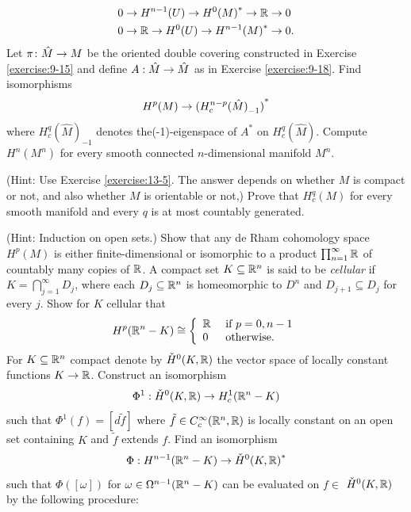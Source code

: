\begin{enumerate}[label=\theexercise.\arabic*.,ref=\theexercise.\arabic*,leftmargin=2.7em]
\[\begin{aligned}
      0 & \rightarrow  {H}^{n- 1}( U)  \rightarrow  {H}^{0}{( M) }^* \rightarrow  \mathbb{R} \rightarrow  0 \\
      0 & \rightarrow  \mathbb{R} \rightarrow  {H}^{0}( U)  \rightarrow  {H}^{n- 1}{( M) }^* \rightarrow  0.
    \end{aligned}
    \]
  \NewItem Let $\pi\colon  \hat{M} \rightarrow  M$ be the oriented double covering constructed in Exercise \ref{exercise:9-15} and define $A : \hat{M} \rightarrow  \hat{M}$ as in Exercise \ref{exercise:9-18}. Find isomorphisms
    \[
      {H}^{p}( M)  \rightarrow  {( {H}_{c}^{n- p}{( \hat{M}) }_{-1}) }^*
    \]
    where ${H}_{c}^{q}{( \hat{M}) }_{-1}$ denotes the(-1)-eigenspace of ${A}^*$ on ${H}_{c}^{q}( \hat{M})$.
  \NewItem Compute ${H}^{n}( {M}^{n})$ for every smooth connected $n$-dimensional manifold ${M}^{n}$.
    \par(Hint: Use Exercise \ref{exercise:13-5}. The answer depends on whether $M$ is compact or not, and also whether $M$ is orientable or not,)
  \NewItem Prove that ${H}_{c}^{q}( M)$ for every smooth manifold and every $q$ is at most countably generated.
    \par(Hint: Induction on open sets.)
  \NewItem Show that any de Rham cohomology space ${H}^{p}( M)$ is either finite-dimensional or isomorphic to a product $\prod_{{n = 1}}^{\infty }\mathbb{R}$ of countably many copies of $\mathbb{R}$.
  \NewItem A compact set $K \subseteq  {\ensuremath{\mathbb{R}}}^{n}$ is said to be \textit{cellular} if $K = \bigcap_{{j = 1}}^{\infty }{D}_{j}$, where each ${D}_{j} \subseteq  {\ensuremath{\mathbb{R}}}^{n}$ is homeomorphic to ${D}^{n}$ and ${D}_{j + 1} \subseteq  {D}_{j}$ for every $j$. Show for $K$ cellular that
    \[
      {H}^{p}( {{\mathbb{R}}^{n}- K})  \cong  \left\{  \begin{array}{ll} \mathbb{R} & \text{ if }p = 0,n- 1 \\  0 & \text{ otherwise. } \end{array}\right.
    \]
  \NewItem For $K \subseteq  {\ensuremath{\mathbb{R}}}^{n}$ compact denote by ${\check{H}}^{0}( {K,\mathbb{R}})$ the vector space of locally constant functions $K \rightarrow  \mathbb{R}$. Construct an isomorphism
    \[
      {\Phi }^{1} : {\check{H}}^{0}( {K,\mathbb{R}})  \rightarrow  {H}_{c}^{1}( {{\mathbb{R}}^{n}- K})
    \]
    such that ${\Phi }^{1}( f)  = [  {d\tilde{f}}]$ where $\tilde{f} \in  {C}_{c}^{\infty }( {{\mathbb{R}}^{n},\mathbb{R}})$ is locally constant on an open set containing $K$ and $\tilde{f}$ extends $f$. Find an isomorphism
    \[
      \Phi  : {H}^{n- 1}( {{\mathbb{R}}^{n}- K})  \rightarrow  {\check{H}}^{0}{( K,\mathbb{R}) }^*
    \]
    such that $\Phi ( [  \omega ]  )$ for $\omega  \in  {\Omega }^{n- 1}( {{\mathbb{R}}^{n}- K})$ can be evaluated on $f \in$  ${\check{H}}^{0}( {K,\mathbb{R}})$ by the following procedure:

\end{enumerate}
